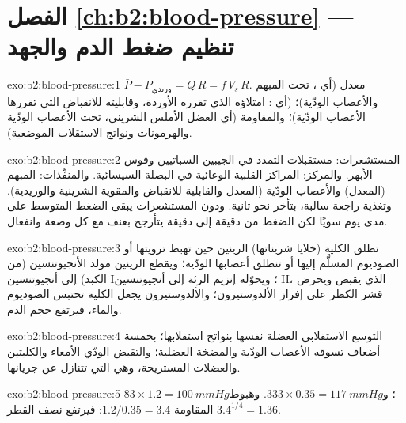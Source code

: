 \section*{الفصل \ref{ch:b2:blood-pressure} --- تنظيم ضغط الدم والجهد}

\begin{solution}{exo:b2:blood-pressure:1}
$\bar P - P_{\text{وريدي}} = Q\,R = f\,V_s\,R$. معدل  (أي
، تحت المبهم والأعصاب الودّية)؛  (أي : امتلاؤه الذي تقرره الأوردة، وقابليته
للانقباض التي تقررها الأعصاب الودّية)؛ والمقاومة (أي
العضل الأملس الشريني، تحت الأعصاب الودّية والهرمونات
ونواتج الاستقلاب الموضعية).
\end{solution}

\begin{solution}{exo:b2:blood-pressure:2}
المستشعرات: مستقبلات التمدد في الجيبين السباتيين وقوس الأبهر.
والمركز: المراكز القلبية الوعائية في البصلة السيسائية. والمنفِّذات:
المبهم (المعدل) والأعصاب الودّية (المعدل والقابلية للانقباض
والمقوية الشرينية والوريدية). وتغذية راجعة سالبة، بتأخر نحو ثانية.
ودون المستشعرات يبقى الضغط المتوسط على مدى يوم
سويًا لكن الضغط من دقيقة إلى دقيقة يتأرجح بعنف مع كل
وضعة وانفعال.
\end{solution}

\begin{solution}{exo:b2:blood-pressure:3}
تطلق الكلية (خلايا شريناتها) الرينين حين تهبط ترويتها أو
الصوديوم المسلَّم إليها أو تنطلق أعصابها الودّية؛ ويقطع الرينين
مولد الأنجيوتنسين (من الكبد) إلى أنجيوتنسين I؛ ويحوّله إنزيم الرئة إلى
أنجيوتنسين II، الذي يقبض  ويحرض
قشر الكظر على إفراز الألدوستيرون؛ والألدوستيرون يجعل الكلية
تحتبس الصوديوم والماء، فيرتفع حجم الدم.
\end{solution}

\begin{solution}{exo:b2:blood-pressure:4}
التوسع الاستقلابي  العضلة نفسها بنواتج
استقلابها؛  بخمسة أضعاف تسوقه الأعصاب
الودّية والمضخة العضلية؛ والتقبض الودّي 
الأمعاء والكليتين والعضلات المستريحة، وهي التي تتنازل عن
جريانها.
\end{solution}

\begin{solution}{exo:b2:blood-pressure:5}
$83\times 1.2 = \qty{100}{mmHg}$؛ و$333\times 0.35 = \qty{117}{mmHg}$.
وهبوط المقاومة $1.2/0.35 = 3.4$: فيرتفع نصف القطر $3.4^{1/4} =
1.36$.
\end{solution}

